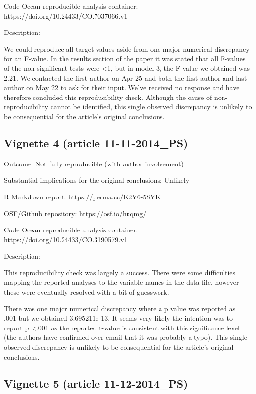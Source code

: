 \documentclass[english,,man,floatsintext]{apa6}
\begin{document}
\begin{appendix}
Code Ocean reproducible analysis container:
https://doi.org/10.24433/CO.7037066.v1

Description:

We could reproduce all target values aside from one major numerical
discrepancy for an F-value. In the results section of the paper it was
stated that all F-values of the non-significant tests were \textless{}1,
but in model 3, the F-value we obtained was 2.21. We contacted the first
author on Apr 25 and both the first author and last author on May 22 to
ask for their input. We've received no response and have therefore
concluded this reproducibility check. Although the cause of
non-reproducibility cannot be identified, this single observed
discrepancy is unlikely to be consequential for the article's original
conclusions.

\hypertarget{vignette-4-article-11-11-2014_ps}{%
\subsection{Vignette 4 (article
11-11-2014\_PS)}\label{vignette-4-article-11-11-2014_ps}}

Outcome: Not fully reproducible (with author involvement)

Substantial implications for the original conclusions: Unlikely

R Markdown report: https://perma.cc/K2Y6-58YK

OSF/Github repository: https://osf.io/huqmg/

Code Ocean reproducible analysis container:
https://doi.org/10.24433/CO.3190579.v1

Description:

This reproducibility check was largely a success. There were some
difficulties mapping the reported analyses to the variable names in the
data file, however these were eventually resolved with a bit of
guesswork.

There was one major numerical discrepancy where a p value was reported
as = .001 but we obtained 3.695211e-13. It seems very likely the
intention was to report p \textless{}.001 as the reported t-value is
consistent with this significance level (the authors have confirmed over
email that it was probably a typo). This single observed discrepancy is
unlikely to be consequential for the article's original conclusions.

\hypertarget{vignette-5-article-11-12-2014_ps}{%
\subsection{Vignette 5 (article
11-12-2014\_PS)}\label{vignette-5-article-11-12-2014_ps}}


\end{appendix}
\end{document}

